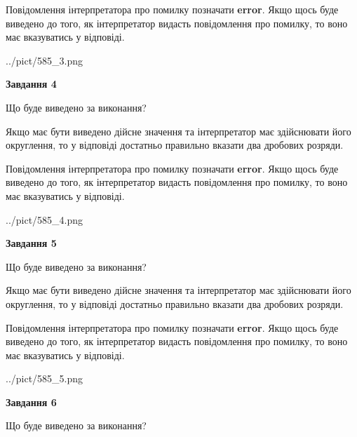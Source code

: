 \documentclass[12pt, ukrainian]{article}
\begin{document}
{\begin {Large}
Повідомлення інтерпретатора про помилку позначати \textbf{error}.
Якщо щось буде виведено до того, як інтерпретатор видасть повідомлення про помилку, 
то воно має вказуватись у відповіді. \par

\begin{center}
	{../pict/585_3.png}
\end{center}
\newpage

{\begin {center}\textbf{Завдання 4}\end {center}}\par
Що буде виведено за виконання? \par

Якщо має бути виведено дійсне значення та інтерпретатор має здійснювати його округлення, 
то у відповіді достатньо правильно вказати два дробових розряди.

Повідомлення інтерпретатора про помилку позначати \textbf{error}.
Якщо щось буде виведено до того, як інтерпретатор видасть повідомлення про помилку, 
то воно має вказуватись у відповіді. \par

\begin{center}
	{../pict/585_4.png}
\end{center}
\newpage

{\begin {center}\textbf{Завдання 5}\end {center}}\par
Що буде виведено за виконання? \par

Якщо має бути виведено дійсне значення та інтерпретатор має здійснювати його округлення, 
то у відповіді достатньо правильно вказати два дробових розряди.

Повідомлення інтерпретатора про помилку позначати \textbf{error}.
Якщо щось буде виведено до того, як інтерпретатор видасть повідомлення про помилку, 
то воно має вказуватись у відповіді. \par

\begin{center}
	{../pict/585_5.png}
\end{center}
\newpage

{\begin {center}\textbf{Завдання 6}\end {center}}\par
Що буде виведено за виконання? \par


\end{Large}}
\end{document}
